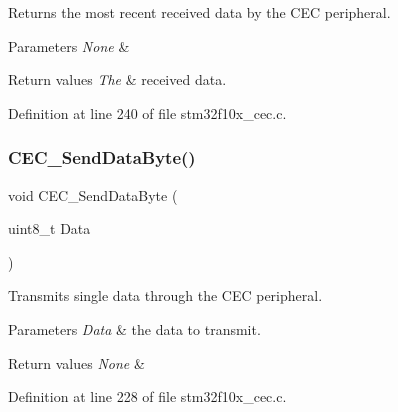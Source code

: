 Returns the most recent received data by the C\+EC peripheral. 


\begin{DoxyParams}{Parameters}
{\em None} & \\
\hline
\end{DoxyParams}

\begin{DoxyRetVals}{Return values}
{\em The} & received data. \\
\hline
\end{DoxyRetVals}


Definition at line 240 of file stm32f10x\+\_\+cec.\+c.

\mbox{\label{group___c_e_c___private___functions_ga6897ab26d8f909f9160e9fac54b97441}} 
\subsubsection{\texorpdfstring{C\+E\+C\+\_\+\+Send\+Data\+Byte()}{CEC\_SendDataByte()}}
{\footnotesize\ttfamily void C\+E\+C\+\_\+\+Send\+Data\+Byte (\begin{DoxyParamCaption}\item[{uint8\+\_\+t}]{Data }\end{DoxyParamCaption})}



Transmits single data through the C\+EC peripheral. 


\begin{DoxyParams}{Parameters}
{\em Data} & the data to transmit. \\
\hline
\end{DoxyParams}

\begin{DoxyRetVals}{Return values}
{\em None} & \\
\hline
\end{DoxyRetVals}


Definition at line 228 of file stm32f10x\+\_\+cec.\+c.

\mbox{\label{group___c_e_c___private___functions_gad2fc626e28a82008a29f062975a9af11}} 
